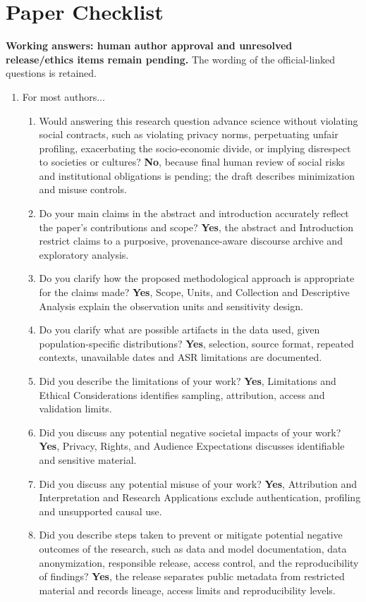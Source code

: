 \section*{Paper Checklist}
\noindent\textbf{Working answers: human author approval and unresolved release/ethics items remain pending.} The wording of the official-linked questions is retained.
\begin{enumerate}
\item For most authors...
\begin{enumerate}
\item Would answering this research question advance science without violating social contracts, such as violating privacy norms, perpetuating unfair profiling, exacerbating the socio-economic divide, or implying disrespect to societies or cultures? \textbf{No}, because final human review of social risks and institutional obligations is pending; the draft describes minimization and misuse controls.
\item Do your main claims in the abstract and introduction accurately reflect the paper's contributions and scope? \textbf{Yes}, the abstract and Introduction restrict claims to a purposive, provenance-aware discourse archive and exploratory analysis.
\item Do you clarify how the proposed methodological approach is appropriate for the claims made? \textbf{Yes}, Scope, Units, and Collection and Descriptive Analysis explain the observation units and sensitivity design.
\item Do you clarify what are possible artifacts in the data used, given population-specific distributions? \textbf{Yes}, selection, source format, repeated contexts, unavailable dates and ASR limitations are documented.
\item Did you describe the limitations of your work? \textbf{Yes}, Limitations and Ethical Considerations identifies sampling, attribution, access and validation limits.
\item Did you discuss any potential negative societal impacts of your work? \textbf{Yes}, Privacy, Rights, and Audience Expectations discusses identifiable and sensitive material.
\item Did you discuss any potential misuse of your work? \textbf{Yes}, Attribution and Interpretation and Research Applications exclude authentication, profiling and unsupported causal use.
\item Did you describe steps taken to prevent or mitigate potential negative outcomes of the research, such as data and model documentation, data anonymization, responsible release, access control, and the reproducibility of findings? \textbf{Yes}, the release separates public metadata from restricted material and records lineage, access limits and reproducibility levels.

\end{enumerate}
\end{enumerate}

